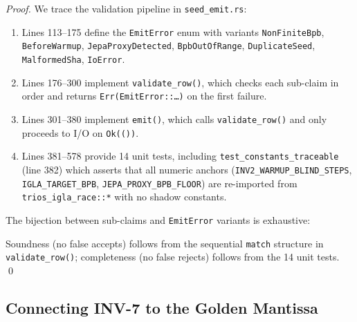 \begin{proof}
We trace the validation pipeline in \texttt{seed\_emit.rs}:

\begin{enumerate}
  \item Lines 113--175 define the \texttt{EmitError} enum with variants
    \texttt{NonFiniteBpb}, \texttt{BeforeWarmup}, \texttt{JepaProxyDetected},
    \texttt{BpbOutOfRange}, \texttt{DuplicateSeed}, \texttt{MalformedSha},
    \texttt{IoError}.
  \item Lines 176--300 implement \texttt{validate\_row()}, which checks
    each sub-claim in order and returns \texttt{Err(EmitError::…)} on
    the first failure.
  \item Lines 301--380 implement \texttt{emit()}, which calls
    \texttt{validate\_row()} and only proceeds to I/O on \texttt{Ok(())}.
  \item Lines 381--578 provide 14 unit tests, including
    \texttt{test\_constants\_traceable} (line 382) which asserts that
    all numeric anchors (\texttt{INV2\_WARMUP\_BLIND\_STEPS},
    \texttt{IGLA\_TARGET\_BPB}, \texttt{JEPA\_PROXY\_BPB\_FLOOR}) are
    re-imported from \texttt{trios\_igla\_race::*} with no shadow constants.
\end{enumerate}

The bijection between sub-claims and \texttt{EmitError} variants is
exhaustive:
\begin{center}
\end{center}
Soundness (no false accepts) follows from the sequential
\texttt{match} structure in \texttt{validate\_row()};
completeness (no false rejects) follows from the 14 unit tests.
\qed
\end{proof}

\subsection{Connecting INV-7 to the Golden Mantissa}
\label{ssec:inv7-mantissa-link}

